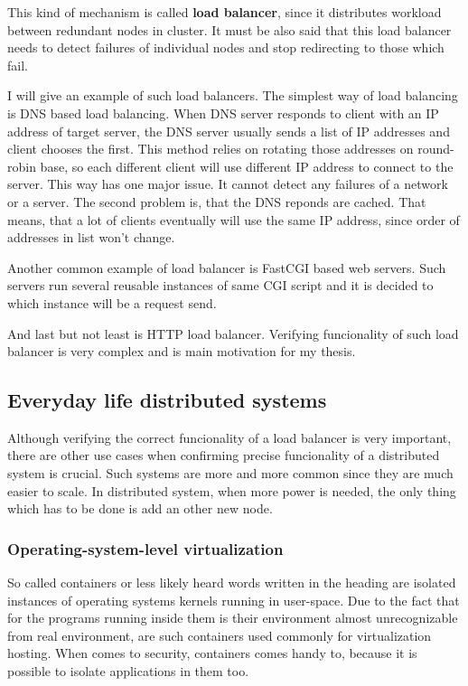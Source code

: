 \documentclass[
  master,
  biblatex,
  glossaries,
  index
]{kidiplom}
\begin{document}
This kind of mechanism is called {\bf load balancer}, since it distributes workload between redundant nodes in cluster. It must be also said that this load balancer needs to detect failures of individual nodes and stop redirecting to those which fail.


I will give an example of such load balancers. The simplest way of load balancing is DNS based load balancing. When DNS server responds to client with an IP address of target server, the DNS server usually sends a list of IP addresses and client chooses the first. This method relies on rotating those addresses on round-robin base, so each different client will use different IP address to connect to the server. This way has one major issue. It cannot detect any failures of a network or a server. The second problem is, that the DNS reponds are cached. That means, that a lot of clients eventually will use the same IP address, since order of addresses in list won't change. %

Another common example of load balancer is FastCGI based web servers. Such servers run several reusable instances of same CGI script and it is decided to which instance will be a request send.

And last but not least is HTTP load balancer. Verifying funcionality of such load balancer is very complex and is main motivation for my thesis. %

\subsection{Everyday life distributed systems}

Although verifying the correct funcionality of a load balancer is very important, there are other use cases when confirming precise funcionality of a distributed system is crucial. Such systems are more and more common since they are much easier to scale. In distributed system, when more power is needed, the only thing which has to be done is add an other new node. %

\subsubsection{Operating-system-level virtualization}

So called containers or less likely heard words written in the heading are isolated instances of operating systems kernels running in user-space. Due to the fact that for the programs running inside them is their environment almost unrecognizable from real environment, are such containers used commonly for virtualization hosting. When comes to security, containers comes handy to, because it is possible to isolate applications in them too.
\end{document}
